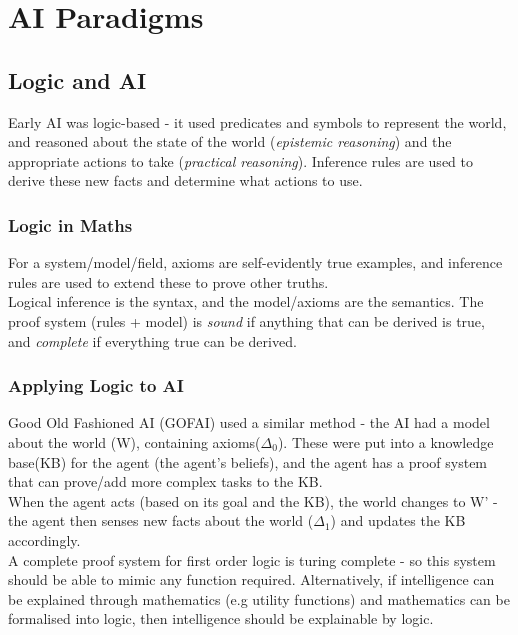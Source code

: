 \section{AI Paradigms}

\subsection{Logic and AI}
Early AI was logic-based - it used predicates and symbols to represent the world, and reasoned about the state of the world (\emph{epistemic reasoning}) and the appropriate actions to take (\emph{practical reasoning}). Inference rules are used to derive these new facts and determine what actions to use. 

\subsubsection{Logic in Maths}
For a system/model/field, axioms are self-evidently true examples, and inference rules are used to extend these to prove other truths. \\

Logical inference is the syntax, and the model/axioms are the semantics. The proof system (rules + model) is \emph{sound} if anything that can be derived is true, and \emph{complete} if everything true can be derived.  

\subsubsection{Applying Logic to AI}
Good Old Fashioned AI (GOFAI) used a similar method - the AI had a model about the world (W), containing axioms($\Delta_0$). These were put into a knowledge base(KB) for the agent (the agent's beliefs), and the agent has a proof system that can prove/add more complex tasks to the KB. \\
When the agent acts (based on its goal and the KB), the world changes to W' - the agent then senses new facts about the world ($\Delta_1$) and updates the KB accordingly. \\
A complete proof system for first order logic is turing complete - so this system should be able to mimic any function required. Alternatively, if intelligence can be explained through mathematics (e.g utility functions) and mathematics can be formalised into logic, then intelligence should be explainable by logic.

